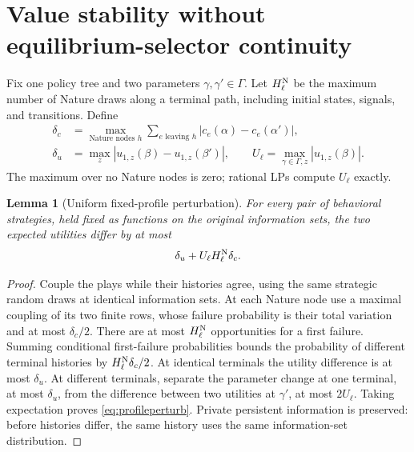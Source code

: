 \documentclass[11pt,a4paper]{article}
\numberwithin{equation}{section}
\newtheorem{lemma}[theorem]{Lemma}
\theoremstyle{definition}
\begin{document}
\section{Value stability without equilibrium-selector continuity}
\label{sec:valuestability}
Fix one policy tree and two parameters \(\gamma,\gamma'\in\Gamma\).
Let \(H_\ell^{\rm N}\) be the maximum number of Nature draws along
a terminal path, including initial states, signals, and transitions.
Define
\begin{equation}\label{eq:perturbdefs}
 \begin{aligned}
 \delta_c&=\max_{\text{Nature nodes }h}
       \sum_{e\text{ leaving }h}|c_e(\alpha)-c_e(\alpha')|,\\
 \delta_u&=\max_z|u_{1,z}(\beta)-u_{1,z}(\beta')|,\qquad
 U_\ell=\max_{\gamma\in\Gamma,z}|u_{1,z}(\beta)|.
 \end{aligned}
\end{equation}
The maximum over no Nature nodes is zero; rational LPs compute
\(U_\ell\) exactly.

\begin{lemma}[Uniform fixed-profile perturbation]\label{lem:coupling}
For every pair of behavioral strategies, held fixed as functions
on the original information sets, the two expected utilities differ
by at most
\begin{equation}\label{eq:profileperturb}
 \delta_u+U_\ell H_\ell^{\rm N}\delta_c .
\end{equation}
\end{lemma}
\begin{proof}
Couple the plays while their histories agree, using the same strategic
random draws at identical information sets. At each Nature node use
a maximal coupling of its two finite rows, whose failure probability
is their total variation and at most \(\delta_c/2\).
There are at most \(H_\ell^{\rm N}\) opportunities for a first failure.
Summing conditional first-failure probabilities bounds the probability
of different terminal histories by \(H_\ell^{\rm N}\delta_c/2\).
At identical terminals the utility difference is at most \(\delta_u\).
At different terminals, separate the parameter change at one terminal,
at most \(\delta_u\), from the difference between two utilities at
\(\gamma'\), at most \(2U_\ell\).
Taking expectation proves \eqref{eq:profileperturb}.
Private persistent information is preserved: before histories differ,
the same history uses the same information-set distribution.
\end{proof}
\end{document}
